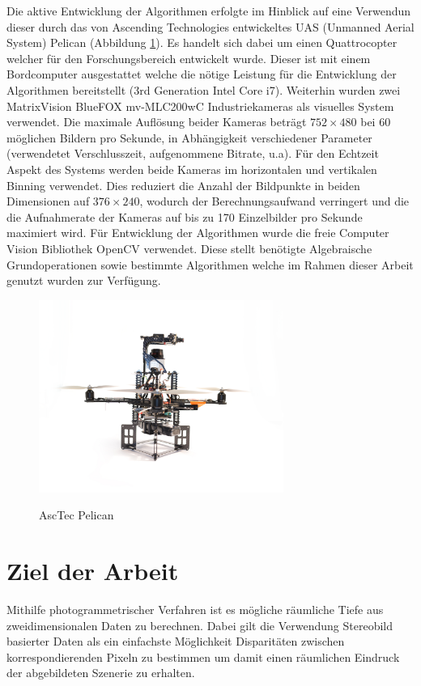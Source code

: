Die aktive Entwicklung der Algorithmen erfolgte im Hinblick auf eine Verwendun dieser durch das von Ascending Technologies \cite{asctec} entwickeltes UAS (Unmanned Aerial System) Pelican (Abbildung \ref{img:pelican}).
Es handelt sich dabei um einen Quattrocopter welcher für den Forschungsbereich entwickelt wurde. Dieser ist mit einem Bordcomputer ausgestattet welche die nötige Leistung für die Entwicklung der Algorithmen bereitstellt (3rd Generation Intel Core i7). Weiterhin wurden zwei MatrixVision BlueFOX mv-MLC200wC Industriekameras als visuelles System verwendet. Die maximale Auflösung beider Kameras beträgt $752\times480$ bei 60 möglichen Bildern pro Sekunde, in Abhängigkeit verschiedener Parameter (verwendetet Verschlusszeit, aufgenommene Bitrate, u.a). Für den Echtzeit Aspekt des Systems werden beide Kameras im horizontalen und vertikalen Binning verwendet. Dies reduziert die Anzahl der Bildpunkte in beiden Dimensionen auf $376\times240$, wodurch der Berechnungsaufwand verringert und die die Aufnahmerate der Kameras auf bis zu 170 Einzelbilder pro Sekunde maximiert wird.
	\noindent
Für Entwicklung der Algorithmen wurde die freie Computer Vision Bibliothek OpenCV \cite{opencv} verwendet. Diese stellt benötigte Algebraische Grundoperationen sowie bestimmte Algorithmen welche im Rahmen dieser Arbeit genutzt wurden zur Verfügung.
\begin{figure}[h]
	\centering
	\includegraphics[width=8cm]{img/pelican}
	\label{img:pelican}
	\caption{AscTec Pelican}
\end{figure}



\section{Ziel der Arbeit}
\label{sec:ziel_der_arbeit}
Mithilfe photogrammetrischer Verfahren ist es mögliche räumliche Tiefe aus zweidimensionalen Daten zu berechnen. Dabei gilt die Verwendung Stereobild basierter Daten als ein einfachste Möglichkeit Disparitäten zwischen korrespondierenden Pixeln zu bestimmen um damit einen räumlichen Eindruck der abgebildeten Szenerie zu erhalten. \\

